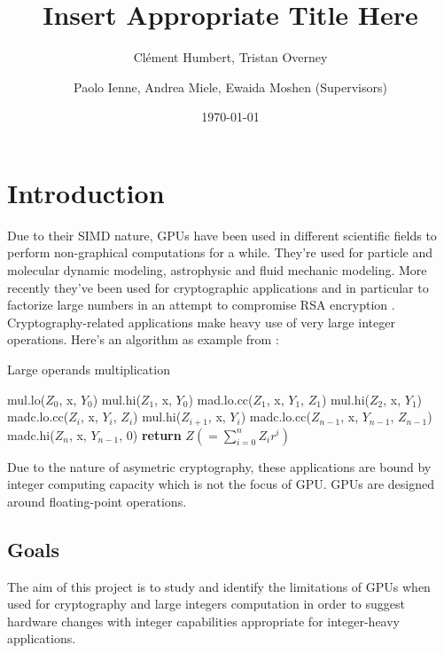 \documentclass{report}
\begin{document}
\title{Insert Appropriate Title Here}
\author{Cl\'{e}ment Humbert, Tristan Overney\and Paolo Ienne, Andrea Miele, Ewaida Moshen (Supervisors)}
\date{\today}
\maketitle

\nocite{*}

\setcounter{tocdepth}{1}
\tableofcontents
\listoffigures

\chapter{Introduction}

    Due to their SIMD nature, GPUs have been used in different scientific fields to perform
    non-graphical computations for a while. They're used for particle and molecular dynamic 
    modeling, astrophysic and fluid mechanic modeling.
    More recently they've been used for cryptographic applications and in particular
    to factorize large numbers in an attempt to compromise RSA encryption \cite{cofact14}.
    Cryptography-related applications make heavy use of very large integer operations.
    Here's an algorithm as example from \cite{cofact14}:
    \begin{algorithm}
    \caption{Large operands multiplication}\label{mulalgo}
    \begin{algorithmic}[1]
        \State mul.lo($Z_0$, x, $Y_0$)
        \State mul.hi($Z_1$, x, $Y_0$)
        \State mad.lo.cc($Z_1$, x, $Y_1$, $Z_1$)
        \State mul.hi($Z_2$, x, $Y_1$)
            \State madc.lo.cc($Z_i$, x, $Y_i$, $Z_i$)
            \State mul.hi($Z_{i+1}$, x, $Y_i$)
        \EndFor
        \State madc.lo.cc($Z_{n-1}$, x, $Y_{n-1}$, $Z_{n-1}$)
        \State madc.hi($Z_n$, x, $Y_{n-1}$, 0)
        \State \textbf{return} $Z (=\sum_{i=0}^nZ_ir^i)$
    \end{algorithmic}
    \end{algorithm}

    Due to the nature of asymetric cryptography, these applications are bound by
    integer computing capacity which is not the focus of GPU. GPUs are designed
    around floating-point operations.

\section{Goals}
    The aim of this project is to study and identify the limitations of GPUs
    when used for cryptography and large integers computation in order to suggest
    hardware changes with integer capabilities appropriate for integer-heavy applications.
\end{document}
